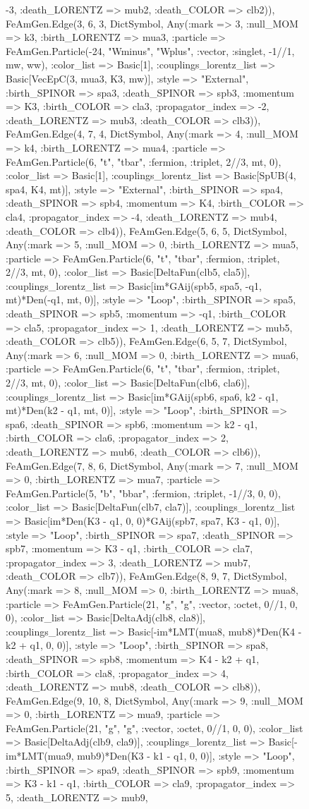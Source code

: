 \documentclass{revtex4}
\begin{document}
\begin{figure}[!htb]
\begin{center}
{-3, :death_LORENTZ => mub2, :death_COLOR => clb2)), FeAmGen.Edge(3, 6, 3, Dict{Symbol, Any}(:mark => 3, :null_MOM => k3, :birth_LORENTZ => mua3, :particle => FeAmGen.Particle(-24, "Wminus", "Wplus", :vector, :singlet, -1//1, mw, ww), :color_list => Basic[1], :couplings_lorentz_list => Basic[VecEpC(3, mua3, K3, mw)], :style => "External", :birth_SPINOR => spa3, :death_SPINOR => spb3, :momentum => K3, :birth_COLOR => cla3, :propagator_index => -2, :death_LORENTZ => mub3, :death_COLOR => clb3)), FeAmGen.Edge(4, 7, 4, Dict{Symbol, Any}(:mark => 4, :null_MOM => k4, :birth_LORENTZ => mua4, :particle => FeAmGen.Particle(6, "t", "tbar", :fermion, :triplet, 2//3, mt, 0), :color_list => Basic[1], :couplings_lorentz_list => Basic[SpUB(4, spa4, K4, mt)], :style => "External", :birth_SPINOR => spa4, :death_SPINOR => spb4, :momentum => K4, :birth_COLOR => cla4, :propagator_index => -4, :death_LORENTZ => mub4, :death_COLOR => clb4)), FeAmGen.Edge(5, 6, 5, Dict{Symbol, Any}(:mark => 5, :null_MOM => 0, :birth_LORENTZ => mua5, :particle => FeAmGen.Particle(6, "t", "tbar", :fermion, :triplet, 2//3, mt, 0), :color_list => Basic[DeltaFun(clb5, cla5)], :couplings_lorentz_list => Basic[im*GAij(spb5, spa5, -q1, mt)*Den(-q1, mt, 0)], :style => "Loop", :birth_SPINOR => spa5, :death_SPINOR => spb5, :momentum => -q1, :birth_COLOR => cla5, :propagator_index => 1, :death_LORENTZ => mub5, :death_COLOR => clb5)), FeAmGen.Edge(6, 5, 7, Dict{Symbol, Any}(:mark => 6, :null_MOM => 0, :birth_LORENTZ => mua6, :particle => FeAmGen.Particle(6, "t", "tbar", :fermion, :triplet, 2//3, mt, 0), :color_list => Basic[DeltaFun(clb6, cla6)], :couplings_lorentz_list => Basic[im*GAij(spb6, spa6, k2 - q1, mt)*Den(k2 - q1, mt, 0)], :style => "Loop", :birth_SPINOR => spa6, :death_SPINOR => spb6, :momentum => k2 - q1, :birth_COLOR => cla6, :propagator_index => 2, :death_LORENTZ => mub6, :death_COLOR => clb6)), FeAmGen.Edge(7, 8, 6, Dict{Symbol, Any}(:mark => 7, :null_MOM => 0, :birth_LORENTZ => mua7, :particle => FeAmGen.Particle(5, "b", "bbar", :fermion, :triplet, -1//3, 0, 0), :color_list => Basic[DeltaFun(clb7, cla7)], :couplings_lorentz_list => Basic[im*Den(K3 - q1, 0, 0)*GAij(spb7, spa7, K3 - q1, 0)], :style => "Loop", :birth_SPINOR => spa7, :death_SPINOR => spb7, :momentum => K3 - q1, :birth_COLOR => cla7, :propagator_index => 3, :death_LORENTZ => mub7, :death_COLOR => clb7)), FeAmGen.Edge(8, 9, 7, Dict{Symbol, Any}(:mark => 8, :null_MOM => 0, :birth_LORENTZ => mua8, :particle => FeAmGen.Particle(21, "g", "g", :vector, :octet, 0//1, 0, 0), :color_list => Basic[DeltaAdj(clb8, cla8)], :couplings_lorentz_list => Basic[-im*LMT(mua8, mub8)*Den(K4 - k2 + q1, 0, 0)], :style => "Loop", :birth_SPINOR => spa8, :death_SPINOR => spb8, :momentum => K4 - k2 + q1, :birth_COLOR => cla8, :propagator_index => 4, :death_LORENTZ => mub8, :death_COLOR => clb8)), FeAmGen.Edge(9, 10, 8, Dict{Symbol, Any}(:mark => 9, :null_MOM => 0, :birth_LORENTZ => mua9, :particle => FeAmGen.Particle(21, "g", "g", :vector, :octet, 0//1, 0, 0), :color_list => Basic[DeltaAdj(clb9, cla9)], :couplings_lorentz_list => Basic[-im*LMT(mua9, mub9)*Den(K3 - k1 - q1, 0, 0)], :style => "Loop", :birth_SPINOR => spa9, :death_SPINOR => spb9, :momentum => K3 - k1 - q1, :birth_COLOR => cla9, :propagator_index => 5, :death_LORENTZ => mub9, }
\end{center}
\end{figure}
\end{document}
